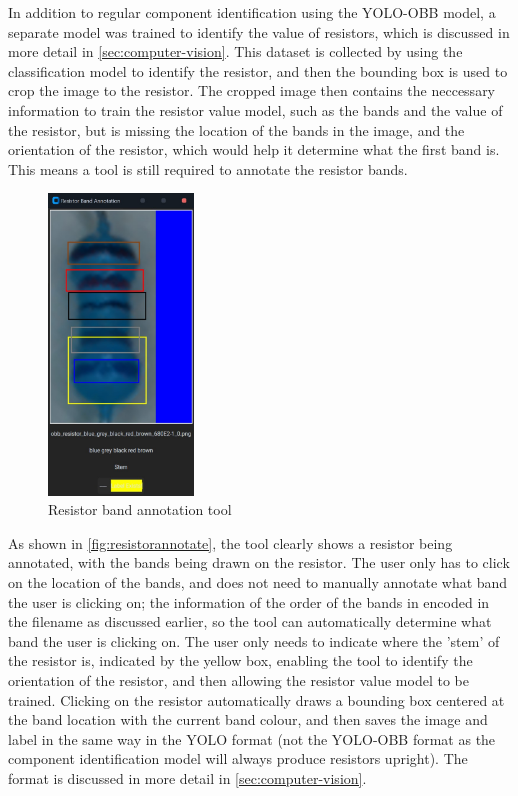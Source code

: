 In addition to regular component identification using the YOLO-OBB model, a separate model was trained to identify the value of resistors, which is discussed in more detail in \autoref{sec:computer-vision}. This dataset is collected by using the classification model to identify the resistor, and then the bounding box is used to crop the image to the resistor. The cropped image then contains the neccessary information to train the resistor value model, such as the bands and the value of the resistor, but is missing the location of the bands in the image, and the orientation of the resistor, which would help it determine what the first band is. This means a tool is still required to annotate the resistor bands.

\begin{figure}[H]
    \hfill
    \begin{minipage}[t]{\textwidth}
      \centering
      \includegraphics[height=8cm]{imgs/python/resistorannotate.jpg}
        \caption{Resistor band annotation tool}
        \label{fig:resistorannotate}
    \end{minipage}
\end{figure}

As shown in \autoref{fig:resistorannotate}, the tool clearly shows a resistor being annotated, with the bands being drawn on the resistor. The user only has to click on the location of the bands, and does not need to manually annotate what band the user is clicking on; the information of the order of the bands in encoded in the filename as discussed earlier, so the tool can automatically determine what band the user is clicking on. The user only needs to indicate where the 'stem' of the resistor is, indicated by the yellow box, enabling the tool to identify the orientation of the resistor, and then allowing the resistor value model to be trained. Clicking on the resistor automatically draws a bounding box centered at the band location with the current band colour, and then saves the image and label in the same way in the YOLO format (not the YOLO-OBB format as the component identification model will always produce resistors upright). The format is discussed in more detail in \autoref{sec:computer-vision}. 

